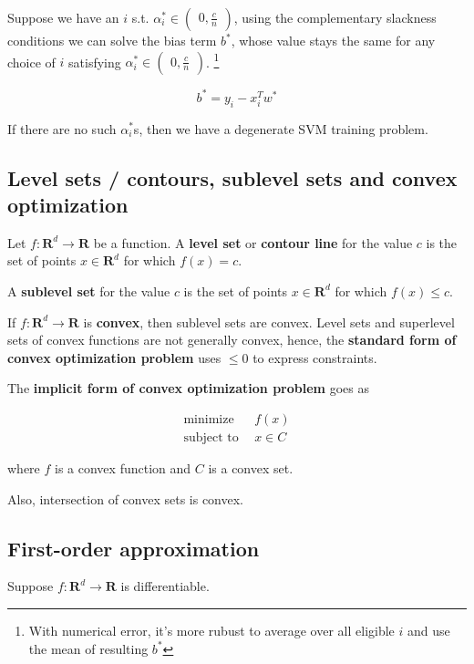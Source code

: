 \documentclass{article}
\begin{document}
Suppose we have an $i$ s.t. $\alpha_i^* \in \begin{pmatrix}0, \frac{c}{n}\end{pmatrix}$, using the complementary slackness conditions we can solve the bias term $b^*$, whose value stays the same for any choice of $i$ satisfying $\alpha_i^* \in \begin{pmatrix}0, \frac{c}{n}\end{pmatrix}$.
\footnote{With numerical error, it's more rubust to average over all eligible $i$ and use the mean of resulting $b^*$}

$$
b^* = y_i - x_i^{T} w^*
$$

If there are no such $\alpha_i^*$s, then we have a degenerate SVM training problem.

\subsection{Level sets / contours, sublevel sets and convex optimization}

Let $f : \mathbf{R}^d \to \mathbf{R}$ be a function.
A \textbf{level set} or \textbf{contour line} for the value $c$ is the set of points $x \in \mathbf{R}^d$ for which $f(x) = c$.

A \textbf{sublevel set} for the value $c$ is the set of points $x \in \mathbf{R}^d$ for which $f(x) \leq c$.

If $f : \mathbf{R}^d \to \mathbf{R}$ is \textbf{convex}, then sublevel sets are convex.
Level sets and superlevel sets of convex functions are not generally convex, hence, the \textbf{standard form of convex optimization problem} uses $\leq 0$ to express constraints.

The \textbf{implicit form of convex optimization problem} goes as

\begin{align*}
\text{minimize}   & ~ ~ f(x) \\
\text{subject to} & ~ ~ x \in C
\end{align*}

where $f$ is a convex function and $C$ is a convex set.

Also, intersection of convex sets is convex.

\subsection{First-order approximation}

Suppose $f : \mathbf{R}^d \to \mathbf{R}$ is differentiable.
\end{document}
